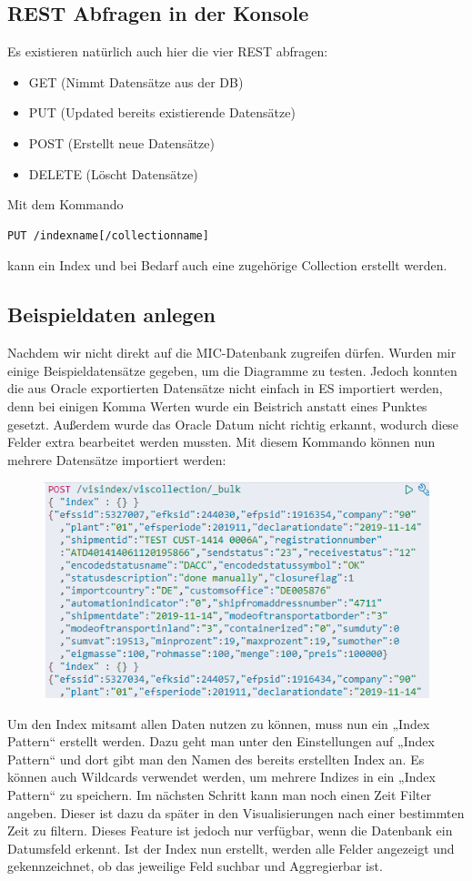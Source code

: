 \subsection{REST Abfragen in der Konsole}
Es existieren natürlich auch hier die vier REST abfragen: 
\begin{itemize}
    \item GET (Nimmt Datensätze aus der DB)
    \item PUT (Updated bereits existierende Datensätze)
    \item POST (Erstellt neue Datensätze)
    \item DELETE (Löscht Datensätze)
\end{itemize}
Mit dem Kommando 
\begin{lstlisting}
PUT /indexname[/collectionname]
\end{lstlisting}
kann ein Index und bei Bedarf auch eine zugehörige Collection erstellt werden.
\subsection{Beispieldaten anlegen}
Nachdem wir nicht direkt auf die MIC-Datenbank zugreifen dürfen. Wurden mir einige Beispieldatensätze gegeben, um die Diagramme zu testen. Jedoch konnten die aus Oracle exportierten Datensätze nicht einfach in ES importiert werden, denn bei einigen Komma Werten wurde ein Beistrich anstatt eines Punktes gesetzt. Außerdem wurde das Oracle Datum nicht richtig erkannt, wodurch diese Felder extra bearbeitet werden mussten. 
Mit diesem Kommando können nun mehrere Datensätze importiert werden:
\begin{figure}[H]
    \centering
    \includegraphics[scale=1.20]{images/kibanaConsole_dataImport.PNG}
\end{figure}
Um den Index mitsamt allen Daten nutzen zu können, muss nun ein „Index Pattern“ erstellt werden.
Dazu geht man unter den Einstellungen auf „Index Pattern“ und dort gibt man den Namen des bereits erstellten Index an. Es können auch Wildcards verwendet werden, um mehrere Indizes in ein „Index Pattern“ zu speichern. Im nächsten Schritt kann man noch einen Zeit Filter angeben. Dieser ist dazu da später in den Visualisierungen nach einer bestimmten Zeit zu filtern. Dieses Feature ist jedoch nur verfügbar, wenn die Datenbank ein Datumsfeld erkennt. 
Ist der Index nun erstellt, werden alle Felder angezeigt und gekennzeichnet, ob das jeweilige Feld suchbar und Aggregierbar ist. 
